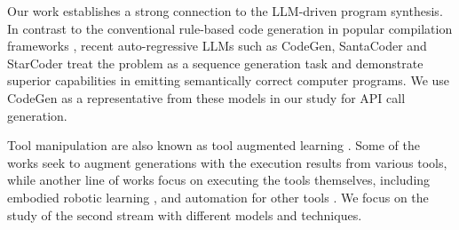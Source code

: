 
Our work establishes a strong connection to the LLM-driven program synthesis. In contrast to the conventional rule-based code generation in popular compilation frameworks \cite{lattner2020mlir}, recent auto-regressive LLMs such as CodeGen\cite{nijkamp2022codegen}, SantaCoder\cite{allal2023santacoder} and StarCoder\cite{li2023starcoder} treat the problem as a sequence generation task and demonstrate superior capabilities in emitting semantically correct computer programs. We use CodeGen as a representative from these models in our study for API call generation. 

Tool manipulation are also known as tool augmented learning \cite{qin2023tool, yang2023foundation}. Some of the works seek to augment generations with the execution results from various tools\cite{schick2023toolformer, mialon2023augmented, yao2022react, izacard2022few, liang2023taskmatrix, cobbe2021training, parisi2022talm}, while another line of works focus on executing the tools themselves, including embodied robotic learning \cite{liang2022code, huang2022language, ahn2022can, singh2022progprompt, vemprala2023chatgpt}, and automation for other tools \cite{yao2023webshop, nakano2021webgpt, wu2023visual, kim2023language}. 
We focus on the study of the second stream with different models and techniques. 

